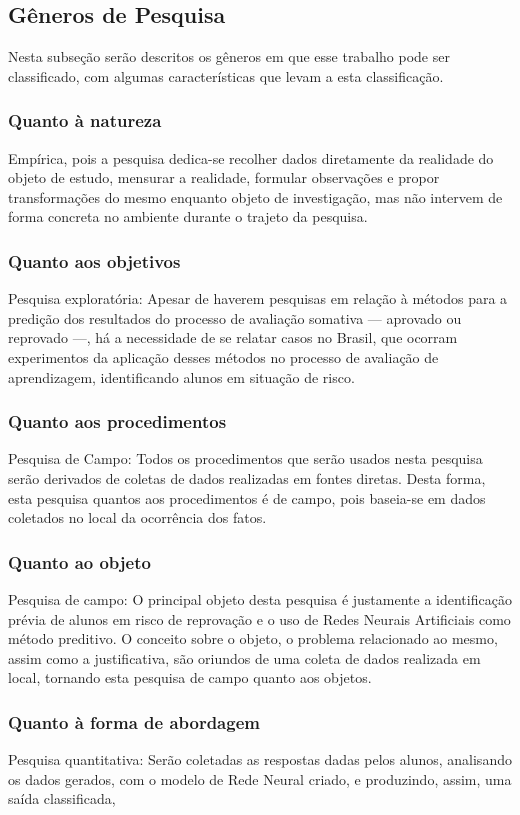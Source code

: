 \subsection{Gêneros de Pesquisa}
Nesta subseção serão descritos os gêneros em que esse trabalho pode ser classificado, com algumas características que levam a esta classificação.

\subsubsection{Quanto à natureza}
Empírica, pois a pesquisa dedica-se recolher dados diretamente da realidade do objeto de estudo, mensurar a realidade, formular observações e propor transformações do mesmo enquanto objeto de investigação, mas não intervem de forma concreta no ambiente durante o trajeto da pesquisa.

\subsubsection{Quanto aos objetivos}
Pesquisa exploratória: Apesar de haverem pesquisas em relação à métodos para a predição dos resultados do processo de avaliação somativa --- aprovado ou reprovado ---, há a necessidade de se relatar casos no Brasil, que ocorram experimentos da aplicação desses métodos no processo de avaliação de aprendizagem, identificando alunos em situação de risco.

\subsubsection{Quanto aos procedimentos}
Pesquisa de Campo: Todos os procedimentos que serão usados nesta pesquisa serão derivados de coletas de dados realizadas em fontes diretas. Desta forma, esta pesquisa quantos aos procedimentos é de campo, pois baseia-se em dados coletados no local da ocorrência dos fatos.

\subsubsection{Quanto ao objeto}
Pesquisa de campo: O principal objeto desta pesquisa é justamente a identificação prévia de alunos em risco de reprovação e o uso de Redes Neurais Artificiais como método preditivo. O conceito sobre o objeto, o problema relacionado ao mesmo, assim como a justificativa, são oriundos de uma coleta de dados realizada em local, tornando esta pesquisa de campo quanto aos objetos.

\subsubsection{Quanto à forma de abordagem}
Pesquisa quantitativa: Serão coletadas as respostas dadas pelos alunos, analisando os dados gerados, com o modelo de Rede Neural criado, e produzindo, assim, uma saída classificada,
